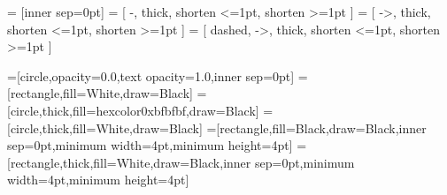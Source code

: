 \usepackage{tikz}

\usetikzlibrary{bayesnet} %



\tikzset{>=latex}
   = [inner sep=0pt]
   = [ -, thick, shorten <=1pt, shorten >=1pt ]
  = [ ->, thick, shorten <=1pt, shorten >=1pt ]
 = [ dashed, ->, thick, shorten <=1pt, shorten >=1pt ]

=[circle,opacity=0.0,text opacity=1.0,inner sep=0pt]
=[rectangle,fill=White,draw=Black]
=[circle,thick,fill=hexcolor0xbfbfbf,draw=Black]
=[circle,thick,fill=White,draw=Black]
=[rectangle,fill=Black,draw=Black,inner sep=0pt,minimum width=4pt,minimum height=4pt]
=[rectangle,thick,fill=White,draw=Black,inner sep=0pt,minimum
width=4pt,minimum height=4pt]

\usepackage{pgfplots}                               %
\pgfplotsset{compat=newest}
\pgfplotsset{plot coordinates/math parser=false}
\newlength\figureheight
\newlength\figurewidth
\setlength\figureheight{1.75in}
\setlength\figurewidth{2.5in}


\newlength\figureheightsmall
\newlength\figurewidthsmall
\setlength\figureheightsmall{1.5in}
\setlength\figurewidthsmall{1.85in}

